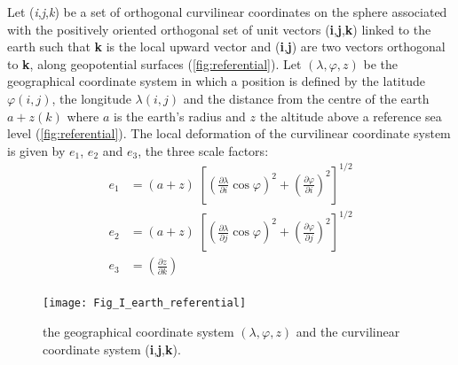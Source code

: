 \documentclass[../main/NEMO_manual]{subfiles}
\begin{document}
Let (\textit{i},\textit{j},\textit{k}) be a set of orthogonal curvilinear coordinates on
the sphere associated with the positively oriented orthogonal set of unit vectors
(\textbf{i},\textbf{j},\textbf{k}) linked to the earth such that
\textbf{k} is the local upward vector and (\textbf{i},\textbf{j}) are two vectors orthogonal to \textbf{k},
\ie along geopotential surfaces (\autoref{fig:referential}).
Let $(\lambda,\varphi,z)$ be the geographical coordinate system in which a position is defined by
the latitude $\varphi(i,j)$, the longitude $\lambda(i,j)$ and
the distance from the centre of the earth $a+z(k)$ where $a$ is the earth's radius and
$z$ the altitude above a reference sea level (\autoref{fig:referential}).
The local deformation of the curvilinear coordinate system is given by $e_1$, $e_2$ and $e_3$,
the three scale factors:
\begin{equation}
  \label{eq:scale_factors}
  \begin{aligned}
    e_1 &=\left( {a+z} \right)\;\left[ {\left( {\frac{\partial \lambda}{\partial i}\cos \varphi } \right)^2
        +\left( {\frac{\partial \varphi }{\partial i}} \right)^2} \right]^{1/2} \\
    e_2 &=\left( {a+z} \right)\;\left[ {\left( {\frac{\partial \lambda }{\partial j}\cos \varphi } \right)^2+
        \left( {\frac{\partial \varphi }{\partial j}} \right)^2} \right]^{1/2} \\
    e_3 &=\left( {\frac{\partial z}{\partial k}} \right) \\
  \end{aligned}
\end{equation}

\begin{figure}[!tb]
  \begin{center}
    \texttt{[image: Fig\_I\_earth\_referential]}
    \caption{	\protect\label{fig:referential}
      the geographical coordinate system $(\lambda,\varphi,z)$ and the curvilinear
      coordinate system (\textbf{i},\textbf{j},\textbf{k}). }
  \end{center}
\end{figure}
\end{document}
